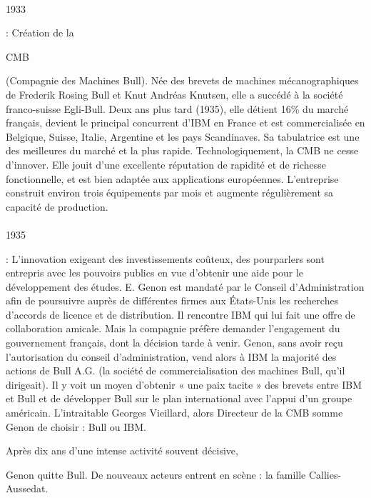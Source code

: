 \documentclass{article}
\begin{document}
		\paragraph{}
		\begin{bf}1933\end{bf}: Création de la \begin{bf}CMB\end{bf} (Compagnie des Machines Bull). Née des brevets de machines 
		mécanographiques de Frederik Rosing Bull et Knut Andréas Knutsen, elle a succédé à la société franco-suisse Egli-Bull. 
		Deux ans plus tard (1935), elle détient 16\% du marché français, devient le principal concurrent d'IBM en France et 
		est commercialisée en Belgique, Suisse, Italie, Argentine et les pays Scandinaves. Sa tabulatrice est une des 
		meilleures du marché et la plus rapide. Technologiquement, la CMB ne cesse d’innover. Elle jouit d’une excellente 
		réputation de rapidité et de richesse fonctionnelle, et est bien adaptée aux applications européennes. L’entreprise 
		construit environ trois équipements par mois et augmente régulièrement sa capacité de production.
		\paragraph{}
		\begin{bf}1935\end{bf}: L'innovation exigeant des investissements coûteux, des pourparlers sont entrepris avec les 
		pouvoirs publics en vue d'obtenir une aide pour le développement des études. E. Genon est mandaté par le Conseil 
		d'Administration afin de poursuivre auprès de différentes firmes aux États-Unis les recherches d'accords de licence et 
		de distribution. Il rencontre IBM qui lui fait une offre de collaboration amicale. Mais la compagnie préfère demander 
		l'engagement du gouvernement français, dont la décision tarde à venir. Genon, sans avoir reçu l'autorisation du conseil 
		d'administration, vend alors à IBM la majorité des actions de Bull A.G. (la société de commercialisation des machines 
		Bull, qu'il dirigeait). Il y voit un moyen d'obtenir « une paix tacite » des brevets entre IBM et Bull et de 
		développer Bull sur le plan international avec l'appui d'un groupe américain. L'intraitable Georges Vieillard, alors 
		Directeur de la CMB somme Genon de choisir : Bull ou IBM. \begin{bf}Après dix ans d'une intense activité souvent décisive,\end{bf} 
		Genon quitte Bull. De nouveaux acteurs entrent en scène : la famille Callies-Aussedat.
\end{document}
